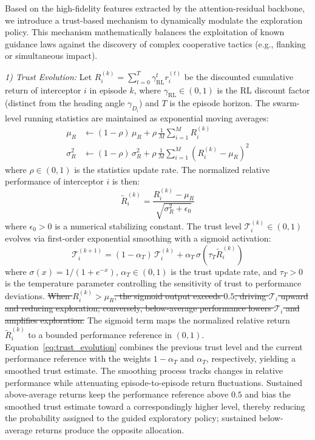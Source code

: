 \documentclass[lettersize,journal]{IEEEtran}
\newcommand{\hladd}[1]{{\color{blue}#1}}
\newcommand{\hldel}[1]{{\color{red}\sout{#1}}}
\begin{document}
Based on the high-fidelity features extracted by the attention-residual backbone, we introduce a trust-based mechanism to dynamically modulate the exploration policy. This mechanism mathematically balances the exploitation of known guidance laws against the discovery of complex cooperative tactics (e.g., flanking or simultaneous impact).

\emph{1) Trust Evolution:} Let $R_i^{(k)} = \sum_{t=0}^{T} \gamma_{\mathrm{RL}}^t r_i^{(t)}$ be the discounted cumulative return of interceptor $i$ in episode $k$, where $\gamma_{\mathrm{RL}} \in (0,1)$ is the RL discount factor (distinct from the heading angle $\gamma_{D_i}$) and $T$ is the episode horizon. The swarm-level running statistics are maintained as exponential moving averages:
\begin{align}
\mu_R &\leftarrow (1-\rho)\,\mu_R + \rho\,\frac{1}{M}\sum_{i=1}^{M} R_i^{(k)} \label{eq:running_stats_mu} \\
\sigma_R^2 &\leftarrow (1-\rho)\,\sigma_R^2 + \rho\,\frac{1}{M}\sum_{i=1}^{M}\!\left(R_i^{(k)} - \mu_R\right)^2 \label{eq:running_stats_sigma}
\end{align}
where $\rho \in (0,1)$ is the statistics update rate. The normalized relative performance of interceptor $i$ is then:
\begin{equation}
\label{eq:trust_normalized}
\tilde{R}_i^{(k)} = \frac{R_i^{(k)} - \mu_R}{\sqrt{\sigma_R^2 + \epsilon_0}}
\end{equation}
where $\epsilon_0 > 0$ is a numerical stabilizing constant. The trust level $\mathcal{T}_i^{(k)} \in (0,1)$ evolves via first-order exponential smoothing with a sigmoid activation:
\begin{equation}
\label{eq:trust_evolution}
\mathcal{T}_i^{(k+1)} = (1-\alpha_T)\,\mathcal{T}_i^{(k)} + \alpha_T\,\sigma\!\left(\tau_T \tilde{R}_i^{(k)}\right)
\end{equation}
where $\sigma(x)=1/(1+e^{-x})$, $\alpha_T\in(0,1)$ is the trust update rate,
and $\tau_T>0$ is the temperature parameter controlling the sensitivity of
trust to performance deviations.
\hldel{When $R_i^{(k)}>\mu_R$, the sigmoid output exceeds $0.5$, driving
$\mathcal{T}_i$ upward and reducing exploration; conversely, below-average
performance lowers $\mathcal{T}_i$ and amplifies exploration.}
\hladd{The sigmoid term maps the normalized relative return
$\tilde{R}_i^{(k)}$ to a bounded performance reference in $(0,1)$.
Equation~\eqref{eq:trust_evolution} combines the previous trust level and
the current performance reference with the weights $1-\alpha_T$ and
$\alpha_T$, respectively, yielding a smoothed trust estimate. The
smoothing process tracks changes in relative performance while attenuating
episode-to-episode return fluctuations. Sustained above-average returns
keep the performance reference above $0.5$ and bias the smoothed trust
estimate toward a correspondingly higher level, thereby reducing the
probability assigned to the guided exploratory policy; sustained
below-average returns produce the opposite allocation.}
\end{document}
